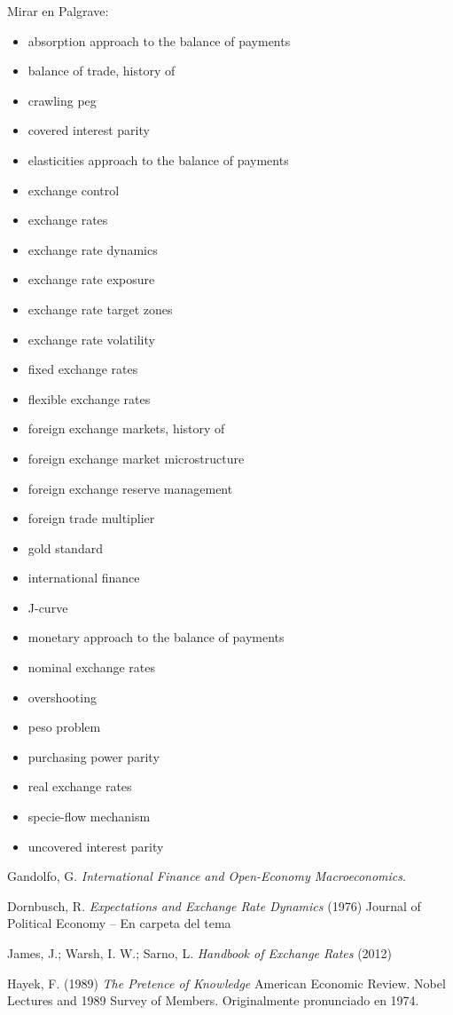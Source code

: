 \documentclass{nuevotema}
\begin{document}
Mirar en Palgrave:
\begin{itemize}
	\item absorption approach to the balance of payments
	\item balance of trade, history of
	\item crawling peg
	\item covered interest parity
	\item elasticities approach to the balance of payments
	\item exchange control
	\item exchange rates
	\item exchange rate dynamics
	\item exchange rate exposure
	\item exchange rate target zones
	\item exchange rate volatility
	\item fixed exchange rates
	\item flexible exchange rates
	\item foreign exchange markets, history of
	\item foreign exchange market microstructure
	\item foreign exchange reserve management
	\item foreign trade multiplier
	\item gold standard
	\item international finance
	\item J-curve
	\item monetary approach to the balance of payments
	\item nominal exchange rates
	\item overshooting
	\item peso problem
	\item purchasing power parity
	\item real exchange rates
	\item specie-flow mechanism
	\item uncovered interest parity
\end{itemize}

Gandolfo, G. \textit{International Finance and Open-Economy Macroeconomics}. 

Dornbusch, R. \textit{Expectations and Exchange Rate Dynamics} (1976) Journal of Political Economy -- En carpeta del tema


James, J.; Warsh, I. W.; Sarno, L. \textit{Handbook of Exchange Rates} (2012) 

Hayek, F. (1989) \textit{The Pretence of Knowledge} American Economic Review. Nobel Lectures and 1989 Survey of Members. Originalmente pronunciado en 1974.
\end{document}
